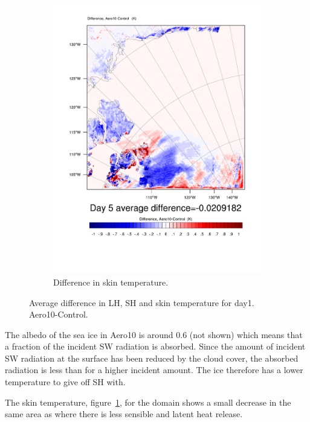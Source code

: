 \begin{figure}
	\begin{subfigure}{0.48\textwidth}
		\includegraphics[width=\textwidth]{results/aero10/diff_Aero10_TSK_Day5.pdf}
		\caption{Difference in skin temperature.}
		\label{subfig:skin_r3Day5}
	\end{subfigure}
	\caption{Average difference in LH, SH and skin temperature for day1. Aero10-Control.}
	\label{fig:lhshskin_r3Day5}
\end{figure}
The albedo of the sea ice in Aero10 is around 0.6 (not shown) which means that a fraction of the incident SW radiation is absorbed. Since the amount of incident SW radiation at the surface has been reduced by the cloud cover, the absorbed radiation is less than for a higher incident amount. The ice therefore has a lower temperature to give off SH with. 

The skin temperature, figure~\ref{subfig:skin_r3Day5}, for the domain shows a small decrease in the same area as where there is less sensible and latent heat release.

